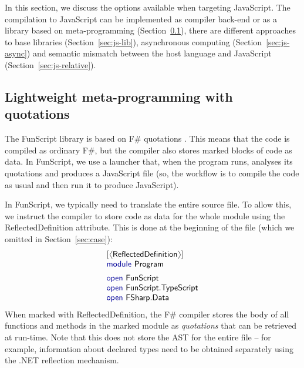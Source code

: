 \documentclass[submission,copyright,creativecommons]{eptcs}
\newcommand{\langl}{\begin{picture}(4.5,7)
\put(1.1,2.5){\rotatebox{60}{\line(1,0){5.5}}}
\put(1.1,2.5){\rotatebox{300}{\line(1,0){5.5}}}
\end{picture}}
\newcommand{\rangl}{\begin{picture}(4.5,7)
\put(.9,2.5){\rotatebox{120}{\line(1,0){5.5}}}
\put(.9,2.5){\rotatebox{240}{\line(1,0){5.5}}}
\end{picture}}
\newcommand{\kvd}[1]{\textnormal{\textcolor{kvdclr}{\sffamily #1}}}
\newcommand{\ident}[1]{\textnormal{\sffamily #1}}
\begin{document}
In this section, we discuss the options available when targeting JavaScript. The compilation to 
JavaScript can be implemented as compiler back-end or as a library based on meta-programming 
(Section~\ref{sec:js-meta}), there are different approaches to base libraries (Section~\ref{sec:js-lib}),
asynchronous computing (Section~\ref{sec:js-async}) and semantic mismatch between the host language
and JavaScript (Section~\ref{sec:js-relative}).

\subsection{Lightweight meta-programming with quotations}
\label{sec:js-meta}

The FunScript library is based on F\# quotations \cite{fsharp-metaprog}. This means that the code
is compiled as ordinary F\#, but the compiler also stores marked blocks of code as data. In FunScript,
we use a launcher that, when the program runs, analyses its quotations and produces a JavaScript file
(so, the workflow is to compile the code as usual and then run it to produce JavaScript).

In FunScript, we typically need to translate the entire source file. To allow this, we instruct the
compiler to store code as data for the whole module using the \ident{ReflectedDefinition} attribute.
This is done at the beginning of the file (which we omitted in Section~\ref{sec:case}):
%
\begin{equation*}
\begin{array}{l}
 \lbrack\langl\ident{ReflectedDefinition}\rangl\rbrack \\
 \kvd{module}~\ident{Program}
 \\[0.5em]
 \kvd{open}~\ident{FunScript} \\
 \kvd{open}~\ident{FunScript.TypeScript} \\
 \kvd{open}~\ident{FSharp.Data} 
\end{array}
\end{equation*}
%
When marked with \ident{ReflectedDefinition}, the F\# compiler stores the body of all functions and 
methods in the marked module as \emph{quotations} that can be retrieved at run-time. Note that this does
not store the AST for the entire file -- for example, information about declared types need to be 
obtained separately using the .NET reflection mechanism.
\end{document}
